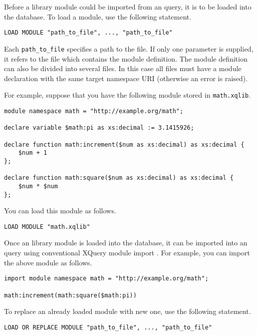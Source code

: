 \documentclass[a4paper,12pt]{article}
\begin{document}
Before a library module could be imported from an query, it is to be loaded into
the database. To load a module, use the following statement.

\begin{verbatim}
LOAD MODULE "path_to_file", ..., "path_to_file"
\end{verbatim}

Each \verb!path_to_file! specifies a path to the file. If only one parameter is
supplied, it refers to the file which contains the module definition. The module
definition can also be divided into several files. In this case all files must
have a module declaration with the same target namespace URI (otherwise an error
is raised).

For example, suppose that you have the following module stored in
\verb!math.xqlib!.

\begin{verbatim}
module namespace math = "http://example.org/math";

declare variable $math:pi as xs:decimal := 3.1415926;

declare function math:increment($num as xs:decimal) as xs:decimal {
    $num + 1
};

declare function math:square($num as xs:decimal) as xs:decimal {
    $num * $num
};
\end{verbatim}

You can load this module as follows.

\begin{verbatim}
LOAD MODULE "math.xqlib"
\end{verbatim}

Once an library module is loaded into the database, it can be imported into an
query using conventional XQuery module import \cite{paper:query-language}. For
example, you can import the above module as follows.

\begin{verbatim}
import module namespace math = "http://example.org/math";

math:increment(math:square($math:pi))

\end{verbatim}


To replace an already loaded module with new one, use the following statement.

\begin{verbatim}
LOAD OR REPLACE MODULE "path_to_file", ..., "path_to_file"
\end{verbatim}
\end{document}
